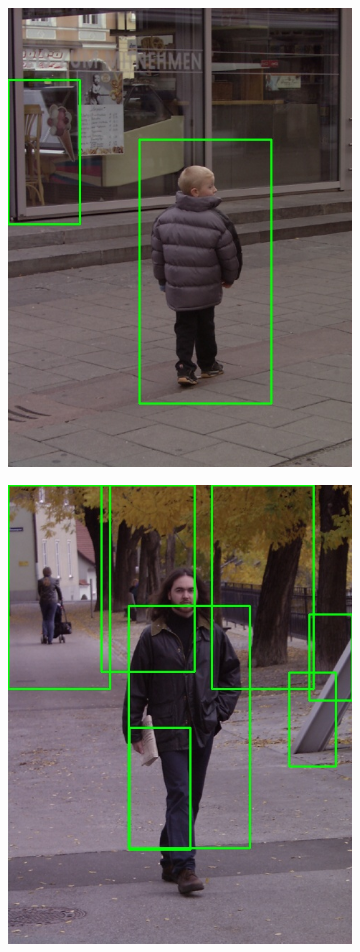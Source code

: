 \documentclass[galician]{./head/uvigo-tfg}
\begin{document}
\begin{figure}[h]
\begin{subfigure}{.3\textwidth}
          \includegraphics[width=0.8\linewidth]{figures/person4.jpg}
          \label{fig:person4}
        \end{subfigure}
        \begin{subfigure}{.3\textwidth}
          \centering
          \includegraphics[width=0.8\linewidth]{figures/person5.jpg}

\end{subfigure}
\end{figure}
\end{document}
